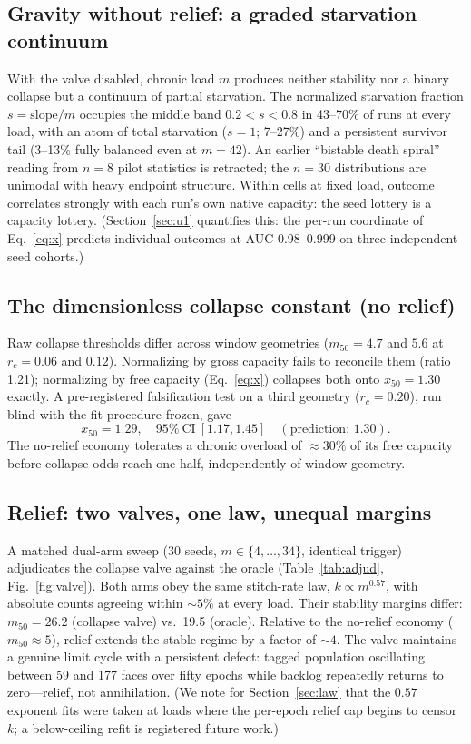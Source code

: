 \documentclass[11pt]{article}
\begin{document}
\subsection{Gravity without relief: a graded starvation continuum}
With the valve disabled, chronic load $m$ produces neither stability nor a
binary collapse but a continuum of partial starvation. The normalized
starvation fraction $s=\mathrm{slope}/m$ occupies the middle band
$0.2<s<0.8$ in 43--70\% of runs at every load, with an atom of total
starvation ($s=1$; 7--27\%) and a persistent survivor tail (3--13\% fully
balanced even at $m=42$). An earlier ``bistable death spiral'' reading from
$n=8$ pilot statistics is retracted; the $n=30$ distributions are unimodal
with heavy endpoint structure. Within cells at fixed load, outcome correlates
strongly with each run's own native capacity: the seed lottery is a capacity
lottery. (Section~\ref{sec:u1} quantifies this: the per-run coordinate of
Eq.~\ref{eq:x} predicts individual outcomes at AUC 0.98--0.999 on three
independent seed cohorts.)

\subsection{The dimensionless collapse constant (no relief)}
Raw collapse thresholds differ across window geometries ($m_{50}=4.7$ and
$5.6$ at $r_c=0.06$ and $0.12$). Normalizing by gross capacity fails to
reconcile them (ratio 1.21); normalizing by free capacity
(Eq.~\ref{eq:x}) collapses both onto $x_{50}=1.30$ exactly. A pre-registered
falsification test on a third geometry ($r_c=0.20$), run blind with the fit
procedure frozen, gave
\begin{equation}
x_{50}=1.29,\quad 95\%\ \mathrm{CI}\ [1.17,1.45]\quad(\text{prediction: }1.30).
\end{equation}
The no-relief economy tolerates a chronic overload of ${\approx}30\%$ of its
free capacity before collapse odds reach one half, independently of window
geometry.

\subsection{Relief: two valves, one law, unequal margins}
A matched dual-arm sweep (30 seeds, $m\in\{4,\dots,34\}$, identical trigger)
adjudicates the collapse valve against the oracle (Table~\ref{tab:adjud},
Fig.~\ref{fig:valve}). Both arms obey the same stitch-rate law,
$k\propto m^{0.57}$, with absolute counts agreeing within ${\sim}5\%$ at every
load. Their stability margins differ: $m_{50}=26.2$ (collapse valve)
vs.\ 19.5 (oracle). Relative to the no-relief economy ($m_{50}\approx5$),
relief extends the stable regime by a factor of ${\sim}4$. The valve maintains
a genuine limit cycle with a persistent defect: tagged population oscillating
between 59 and 177 faces over fifty epochs while backlog repeatedly returns to
zero---relief, not annihilation. (We note for Section~\ref{sec:law} that the
$0.57$ exponent fits were taken at loads where the per-epoch relief cap
begins to censor $k$; a below-ceiling refit is registered future work.)
\end{document}

